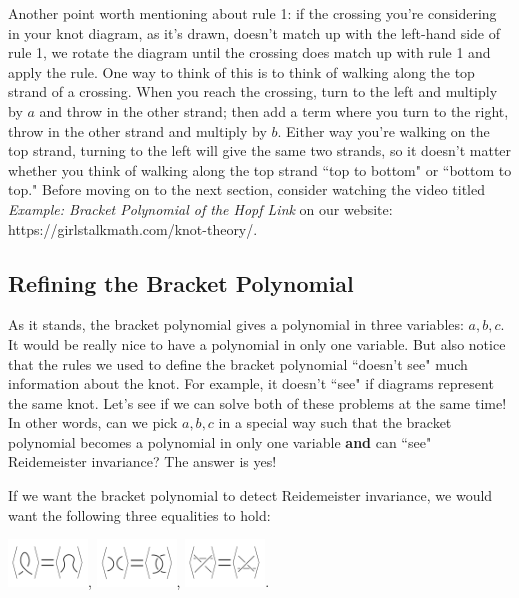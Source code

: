 \documentclass[12 pt]{article}
\begin{document}
Another point worth mentioning about rule 1: if the crossing you're considering in your knot diagram, as it's drawn, doesn't match up with the left-hand side of rule 1, we rotate the diagram until the crossing does match up with rule 1 and apply the rule. One way to think of this is to think of walking along the top strand of a crossing. When you reach the crossing, turn to the left and multiply by $a$ and throw in the other strand; then add a term where you turn to the right, throw in the other strand and multiply by $b$. Either way you're walking on the top strand, turning to the left will give the same two strands, so it doesn't matter whether you think of walking along the top strand ``top to bottom" or ``bottom to top." Before moving on to the next section, consider watching the video titled {\it Example: Bracket Polynomial of the Hopf Link} on our website: https://girlstalkmath.com/knot-theory/.

\subsection{Refining the Bracket Polynomial}

As it stands, the bracket polynomial gives a polynomial in three variables: $a,b,c$. It would be really nice to have a polynomial in only one variable. But also notice that the rules we used to define the bracket polynomial ``doesn't see" much information about the knot. For example, it doesn't ``see" if diagrams represent the same knot. Let's see if we can solve both of these problems at the same time! In other words, can we pick $a,b,c$ in a special way such that the bracket polynomial becomes a polynomial in only one variable \textbf{and} can ``see" Reidemeister invariance? The answer is yes!

If we want the bracket polynomial to detect Reidemeister invariance, we would want the following three equalities to hold:

\includegraphics[height = 0.5in]{bracket_equal_3.jpg},
\includegraphics[height = 0.5in]{bracket_equal_1.jpg},
\includegraphics[height = 0.5in]{bracket_equal_2.jpg}.
\end{document}
